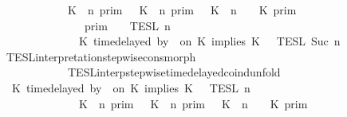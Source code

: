 \begin{isabellebody}
\ \ \ \ \ \ \ \ \ \ {\isacharequal}\ {\isacharparenleft}{\isasymlbrakk}\ K\ {\isasymnot}{\isasymUp}\ n\ {\isasymrbrakk}\isactrlsub p\isactrlsub r\isactrlsub i\isactrlsub m\ {\isasymunion}\ {\isasymlbrakk}\ K\ {\isasymUp}\ n\ {\isasymrbrakk}\isactrlsub p\isactrlsub r\isactrlsub i\isactrlsub m\ {\isasyminter}\ {\isasymlbrakk}\ K\ {\isacharat}\ n\ {\isasymoplus}\ {\isasymdelta}{\isasymtau}\ {\isasymRightarrow}\ K\ {\isasymrbrakk}\isactrlsub p\isactrlsub r\isactrlsub i\isactrlsub m{\isacharparenright}\isanewline
\ \ \ \ \ \ \ \ \ \ \ \ {\isasyminter}\ {\isacharparenleft}{\isasymlbrakk}{\isasymlbrakk}\ {\isasymGamma}\ {\isasymrbrakk}{\isasymrbrakk}\isactrlsub p\isactrlsub r\isactrlsub i\isactrlsub m\ {\isasyminter}\ {\isacharparenleft}{\isasymlbrakk}{\isasymlbrakk}\ {\isasymPsi}\ {\isasymrbrakk}{\isasymrbrakk}\isactrlsub T\isactrlsub E\isactrlsub S\isactrlsub L\isactrlbsup {\isasymge}\ n\isactrlesup \isanewline
\ \ \ \ \ \ \ \ \ \ \ \ {\isasyminter}\ {\isasymlbrakk}{\isasymlbrakk}\ {\isacharparenleft}K\ time{\isacharminus}delayed\ by\ {\isasymdelta}{\isasymtau}\ on\ K\ implies\ K\ {\isacharhash}\ {\isasymPhi}\ {\isasymrbrakk}{\isasymrbrakk}\isactrlsub T\isactrlsub E\isactrlsub S\isactrlsub L\isactrlbsup {\isasymge}\ Suc\ n\isactrlesup {\isacharparenright}{\isacharparenright}{\isacartoucheclose}\isanewline
\ \ \ \ \ \ \isamarkupfalse%
\ TESL{\isacharunderscore}interpretation{\isacharunderscore}stepwise{\isacharunderscore}cons{\isacharunderscore}morph\isanewline
\ \ \ \ \ \ \ \ \ \ \ \ TESL{\isacharunderscore}interp{\isacharunderscore}stepwise{\isacharunderscore}timedelayed{\isacharunderscore}coind{\isacharunderscore}unfold\isanewline
\ \ \ \ \isamarkupfalse%
\ {\isacharminus}\isanewline
\ \ \ \ \ \ \isamarkupfalse%
\ {\isacartoucheopen}{\isasymlbrakk}{\isasymlbrakk}\ {\isacharparenleft}K\ time{\isacharminus}delayed\ by\ {\isasymdelta}{\isasymtau}\ on\ K\ implies\ K\ {\isacharhash}\ {\isasymPsi}\ {\isasymrbrakk}{\isasymrbrakk}\isactrlsub T\isactrlsub E\isactrlsub S\isactrlsub L\isactrlbsup {\isasymge}\ n\isactrlesup \isanewline
\ \ \ \ \ \ \ \ \ \ \ \ {\isacharequal}\ {\isacharparenleft}{\isasymlbrakk}\ K\ {\isasymnot}{\isasymUp}\ n\ {\isasymrbrakk}\isactrlsub p\isactrlsub r\isactrlsub i\isactrlsub m\ {\isasymunion}\ {\isasymlbrakk}\ K\ {\isasymUp}\ n\ {\isasymrbrakk}\isactrlsub p\isactrlsub r\isactrlsub i\isactrlsub m\ {\isasyminter}\ {\isasymlbrakk}\ K\ {\isacharat}\ n\ {\isasymoplus}\ {\isasymdelta}{\isasymtau}\ {\isasymRightarrow}\ K\ {\isasymrbrakk}\isactrlsub p\isactrlsub r\isactrlsub i\isactrlsub m{\isacharparenright}\isanewline

\end{isabellebody}

